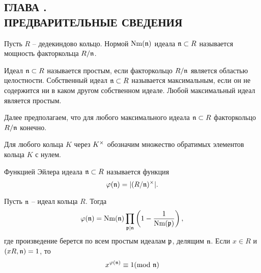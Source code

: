 \documentclass[_dissertation.tex]{subfiles}
\begin{document}
\onlyinsubfile{
    \renewcommand{\contentsname}{ОГЛАВЛЕНИЕ}
    \setcounter{tocdepth}{3}
    \tableofcontents
}

\newpage
\begin{center}
    \section*{ГЛАВА .\\ ПРЕДВАРИТЕЛЬНЫЕ СВЕДЕНИЯ}\label{ch:Prelimiaries}
\end{center}

Пусть $R$ -- дедекиндово кольцо.
Нормой $\textrm{Nm}(\mathfrak{n})$ идеала $\mathfrak{n} \subset R$ называется мощность факторкольца $R/\mathfrak{n}$.

Идеал $\mathfrak{n} \subset R$ называется простым, если факторкольцо $R/\mathfrak{n}$ является областью целостности.
Собственный идеал $\mathfrak{n} \subset R$ называется максимальным, если он не содержится ни в каком другом собственном идеале.
Любой максимальный идеал является простым.

Далее предполагаем, что для любого  максимального идеала $\mathfrak{n} \subset R$ факторкольцо $R/\mathfrak{n}$ конечно.

Для любого кольца $K$ через $K^{\times}$ обозначим множество обратимых элементов кольца $K$ с нулем.

\begin{definition}
    Функцией Эйлера идеала $\mathfrak{n} \subset R$ называется функция
    \begin{equation*}
        \varphi(\mathfrak{n}) = |(R/\mathfrak{n})^{\times}|.
    \end{equation*}
\end{definition}

\begin{statement}\cite{Narkiewicz}\label{statement:euler_function}
    Пусть $\mathfrak{n}$ -- идеал кольца $R$.
    Тогда
    \begin{equation*}
        \varphi(\mathfrak{n}) = \textrm{Nm}(\mathfrak{n}) \prod_{\mathfrak{p} | \mathfrak{n}} \left(
            1 - \frac{1}{\textrm{Nm}(\mathfrak{p})}
        \right),
    \end{equation*}
    где произведение берется по всем простым идеалам $\mathfrak{p}$, делящим $\mathfrak{n}$.
    Если $x \in R$ и $(xR, \mathfrak{n}) = 1$, то
    \begin{equation*}
        x^{\varphi(\mathfrak{n})} \equiv 1 (\textrm{mod } \mathfrak{n})
    \end{equation*}
\end{statement}
\end{document}
